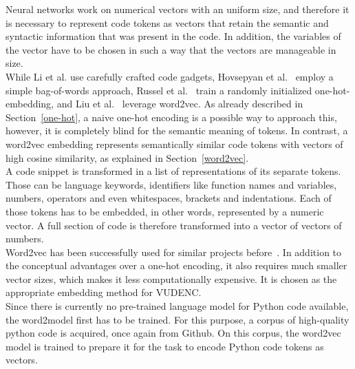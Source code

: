\documentclass[
a4paper,
pagesize,
pdftex,
12pt,
twoside, %
BCOR=5mm, %
ngerman,
fleqn,
final,
]{scrartcl}
\begin{document}
	Neural networks work on numerical vectors with an uniform size, and therefore it is necessary to represent code tokens as vectors that retain the semantic and syntactic information that was present in the code. In addition, the variables of the vector have to be chosen in such a way that the vectors are manageable in size.\\
	While Li et al.\cite{Li.2018} use carefully crafted code gadgets, Hovsepyan et al.~\cite{Hovsepyan.2012} employ a simple bag-of-words approach, Russel et al.~\cite{Russell.2018} train a randomly initialized one-hot-embedding, and Liu et al.~\cite{Liu.2018} leverage word2vec. As already described in Section~\ref{one-hot}, a naive one-hot encoding is a possible way to approach this, however, it is completely blind for the semantic meaning of tokens. In contrast, a word2vec embedding represents semantically similar code tokens with vectors of high cosine similarity, as explained in Section~\ref{word2vec}.\\
	A code snippet is transformed in a list of representations of its separate tokens. Those can be language keywords, identifiers like function names and variables, numbers, operators and even whitespaces, brackets and indentations. Each of those tokens has to be embedded, in other words, represented by a numeric vector. A full section of code is therefore transformed into a vector of vectors of numbers.\\
	Word2vec has been successfully used for similar projects before~\cite{Liu.2018}. In addition to the conceptual advantages over a one-hot encoding, it also requires much smaller vector sizes, which makes it less computationally expensive. It is chosen as the appropriate embedding method for VUDENC.\\
	Since there is currently no pre-trained language model for Python code available, the word2model first has to be trained. For this purpose, a corpus of high-quality python code is acquired, once again from Github. On this corpus, the word2vec model is trained to prepare it for the task to encode Python code tokens as vectors.
	
\end{document}
